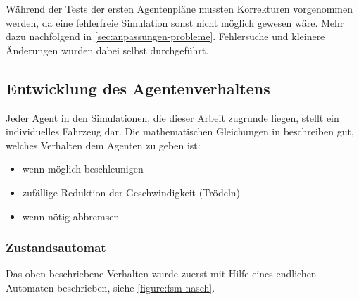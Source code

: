 Während der Tests der ersten Agentenpläne mussten Korrekturen vorgenommen werden, da eine fehlerfreie Simulation sonst nicht möglich gewesen wäre. 
Mehr dazu nachfolgend in \cref{sec:anpassungen-probleme}.
Fehlersuche und kleinere Änderungen wurden dabei selbst durchgeführt.







\subsection{Entwicklung des Agentenverhaltens}
\label{sec:entwicklung-agentenplan}

Jeder Agent in den Simulationen, die dieser Arbeit zugrunde liegen, stellt ein individuelles Fahrzeug dar.
Die mathematischen Gleichungen in \cite{na-sch} beschreiben gut, welches Verhalten dem Agenten zu geben ist: 
\begin{itemize}
\itemsep0em
	\item wenn möglich beschleunigen
	\item zufällige Reduktion der Geschwindigkeit (Trödeln)
	\item wenn nötig abbremsen
\end{itemize}



\subsubsection{Zustandsautomat}
\label{sec:zustandsautomat}

Das oben beschriebene Verhalten wurde zuerst mit Hilfe eines endlichen Automaten beschrieben, siehe \cref{figure:fsm-nasch}.

